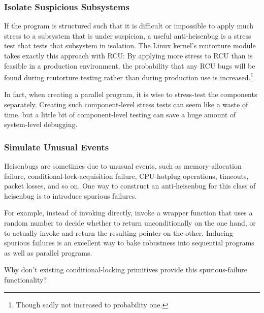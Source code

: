 \subsubsection{Isolate Suspicious Subsystems}
\label{sec:debugging:Isolate Suspicious Subsystems}

If the program is structured such that it is difficult or impossible
to apply much stress to a subsystem that is under suspicion,
a useful anti-heisenbug is a stress test that tests that subsystem in
isolation.
The Linux kernel's rcutorture module takes exactly this approach with
RCU: By applying more stress to RCU than is feasible in a production
environment, the probability that any RCU bugs will be found during
rcutorture testing rather than during production use is increased.\footnote{
	Though sadly not increased to probability one.}

In fact, when creating a parallel program, it is wise to stress-test
the components separately.
Creating such component-level stress tests can seem like a waste of time,
but a little bit of component-level testing can save a huge amount
of system-level debugging.

\subsubsection{Simulate Unusual Events}
\label{sec:debugging:Simulate Unusual Events}

Heisenbugs are sometimes due to unusual events, such as
memory-allocation failure, conditional-lock-acquisition failure,
CPU-hotplug operations, timeouts, packet losses, and so on.
One way to construct an anti-heisenbug for this class of heisenbug
is to introduce spurious failures.

For example, instead of invoking  directly, invoke
a wrapper function that uses a random number to decide whether
to return  unconditionally on the one hand, or to actually
invoke  and return the resulting pointer on the other.
Inducing spurious failures is an excellent way to bake robustness into
sequential programs as well as parallel programs.

\QuickQuiz{}
	Why don't existing conditional-locking primitives provide this
	spurious-failure functionality?
 \QuickQuizEnd

